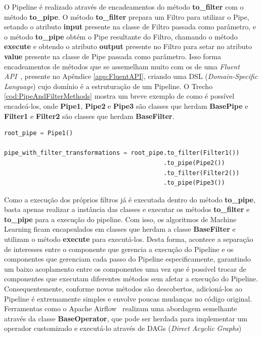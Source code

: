 \documentclass[portugues]{ic-tese}
\begin{document}
O Pipeline é realizado através de encadeamentos do método \textbf{to\_filter} com o método \textbf{to\_pipe}. O método \textbf{to\_filter} prepara um Filtro para utilizar o Pipe, setando o atributo \textbf{input} presente na classe de Filtro passada como parâmetro, e o método \textbf{to\_pipe} obtém o Pipe resultante do Filtro, chamando o método \textbf{execute} e obtendo o atributo \textbf{output} presente no Filtro para setar no atributo \textbf{value} presente na classe de Pipe passada como parâmetro. Isso forma encadeamentos de métodos que se assemelham muito com os de uma \textit{Fluent API}~\citep{Fowler_2005}, presente no Apêndice \ref{app:FluentAPI}, criando uma DSL (\textit{Domain-Specific Language}) cujo domínio é a estruturação de um Pipeline. O Trecho \ref{cod:PipeAndFilterMethods} mostra um breve exemplo de como é possível encadeá-los, onde \textbf{Pipe1}, \textbf{Pipe2} e \textbf{Pipe3} são classes que herdam \textbf{BasePipe} e \textbf{Filter1} e \textbf{Filter2} são classes que herdam \textbf{BaseFilter}.

\begin{lstlisting}[language=Python, caption=Exemplo de uso do \textit{Framework} para encadeamento dos Pipelines,label=cod:PipeAndFilterMethods]
root_pipe = Pipe1()

pipe_with_filter_transformations = root_pipe.to_filter(Filter1())
											.to_pipe(Pipe2())
											.to_filter(Filter2())
											.to_pipe(Pipe3())
\end{lstlisting}

Como a execução dos próprios filtros já é executada dentro do método \textbf{to\_pipe}, basta apenas realizar a instância das classes e executar os métodos \textbf{to\_filter} e \textbf{to\_pipe} para a execução do pipeline. Com isso, os algoritmos de Machine Learning ficam encapsulados em classes que herdam a classe \textbf{BaseFilter} e utilizam o método \textbf{execute} para executá-los. Desta forma, acontece a separação de interesses entre o componente que gerencia a execução do Pipeline e os componentes que gerenciam cada passo do Pipeline especificamente, garantindo um baixo acoplamento entre os componentes uma vez que é possível trocar de componentes que executam diferentes métodos sem afetar a execução do Pipeline. Consequentemente, conforme novos métodos são descobertos, adicioná-los ao Pipeline é extremamente simples e envolve poucas mudanças no código original. Ferramentas como o Apache Airflow~\citep{ApacheAirflow_2022} realizam uma abordagem semelhante através da classe \textbf{BaseOperator}, que pode ser herdada para implementar um operador customizado e executá-lo através de DAGs (\textit{Direct Acyclic Graphs})
\end{document}
